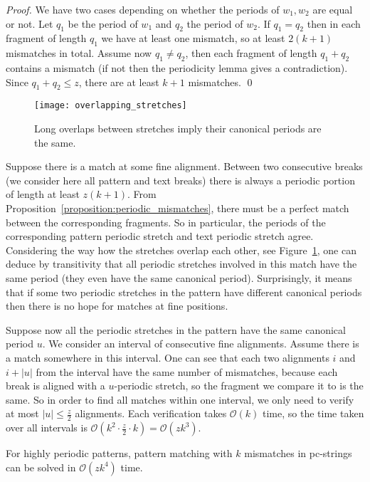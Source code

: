 \documentclass[runningheads]{llncs}
\begin{document}
\begin{proof}
We have two cases depending on whether the periods of $w_1, w_2$ are equal or not. Let $q_1$ be the period of $w_1$ and $q_2$ the period of $w_2$. If $q_1=q_2$ then in each fragment of length $q_1$ we have at least one mismatch, so at least $2(k+1)$ mismatches in total. Assume now $q_1\neq q_2$, then each fragment of length $q_1+q_2$ contains a mismatch (if not then the periodicity lemma gives a contradiction). Since $q_1+q_2\leq z$, there are at least $k+1$ mismatches.
\qed
\end{proof}

\begin{figure}[t]
\texttt{[image: overlapping\_stretches]}
\caption{Long overlaps between stretches imply their canonical periods are the same.}
\label{figure:overlapping stretches}
\end{figure}

Suppose there is a match at some fine alignment. Between two consecutive breaks (we consider here all pattern and text breaks) there is always a periodic portion of length at least $z(k+1)$. From Proposition~\ref{proposition:periodic_mismatches}, there must be a perfect match between the corresponding fragments. So in particular, the periods of the corresponding pattern periodic stretch and text periodic stretch agree. Considering the way how the stretches overlap each other, see Figure~\ref{figure:overlapping stretches}, one can deduce by transitivity that all periodic stretches involved in this match have the same period (they even have the same canonical period). Surprisingly, it means that if some two periodic stretches in the pattern have different canonical periods then there is no hope for matches at fine positions. 

Suppose now all the periodic stretches in the pattern have the same canonical period $u$. We consider an interval of consecutive fine alignments. Assume there is a match somewhere in this interval. One can see that each two alignments $i$ and $i+|u|$ from the interval have the same number of mismatches, because each break is aligned with a $u$-periodic stretch, so 
the fragment we compare it to is the same.
So in order to find all matches within one interval, we only need to verify at most $|u|\leq \frac{z}{2}$ alignments. Each verification takes $\mathcal{O}(k)$ time, so the time taken over all intervals is $\mathcal{O}(k^2\cdot \frac{z}{2} \cdot k)=\mathcal{O}(zk^3)$.

\begin{theorem}\label{theorem:algorithm_highlyperiodic}
For highly periodic patterns, pattern matching with $k$ mismatches in pc-strings can be solved in $\mathcal{O}(zk^4)$ time.
\end{theorem}
\end{document}
